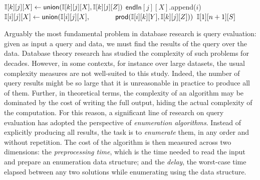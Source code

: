 \begin{algorithm}[t]
\begin{algorithmic}[1]
                   \label{ln:calc} 
                           \label{ln:directProdBegin}                             
                            \State $\mathbb{I}[k][j][X] \gets \mathsf{union}(\mathbb{I}[k][j][X],
                            \mathbb{I}[k][j][Z])$ \label{ln:directProdEnd}
                          \EndFor
                        \If{$\tableI[k][j][Z] \neq \empt $}
                        \label{ln:kind2begin}                             
                                  \label{ln:innermost}
                                \If{$\tableI[i][j][X]=\empt$}
                                  \label{ln:innermost3}
                                  \State $\mathsf{endIn}[j][X]$.append($i$)
                                  \label{ln:endset2}
                                \EndIf
                                  \label{ln:innermost2}
                                \State $\mathbb{I}[i][j][X] \gets \mathsf{union}(\mathbb{I}[i][j][X],$
                                \State $\mbox{~}\hspace{3em} \mathsf{prod}(\mathbb{I}[i][k][Y], \mathbb{I}[k][j][Z]))$
                               \EndFor
                            \EndFor
                        \label{ln:kind2end}                             
                         \EndIf
                    \EndFor
                  \EndFor
                  \EndFor
                  \State\Return $\mathbb{I}[1][n+1][S]$ \label{ln:last}
\end{algorithmic}%
\end{algorithm}%

Arguably the most fundamental problem in database research is query
evaluation: given as input a query and data, we must find the results of the query over the data.
Database theory research has studied the complexity of such problems for 
decades.
However, in some contexts, for instance over large datasets, the usual
complexity measures are not well-suited to this study.
Indeed, the number of query results might be so large that it is unreasonable in
practice to produce all of them.
Further, in theoretical terms, the complexity of an algorithm may be dominated by the cost of writing
the full output, hiding the actual complexity of the
computation.
For this reason, a significant line of research on query evaluation has adopted the perspective of \emph{enumeration algorithms}.
Instead of explicitly producing all results, the task is to \emph{enumerate} them, in any order and without repetition.
The cost of the algorithm is then measured across two dimensions: the
\emph{preprocessing time}, which is the time needed to read the input and
prepare an enumeration data structure; and the \emph{delay}, the worst-case time
elapsed between any two solutions while enumerating using the data structure.


